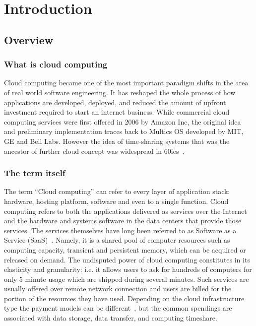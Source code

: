\documentclass[licencjacka,en]{thesisclass}
\begin{document}
\chapter{Introduction}


    \section{Overview}

        \subsection{What is cloud computing}

        Cloud computing became one of the most important paradigm shifts in the area of real world software engineering.
        It has reshaped the whole process of how applications are developed, deployed, and reduced the amount of upfront
        investment required to start an internet business. While commercial cloud computing services were first offered
        in 2006 by Amazon Inc, the original idea and preliminary implementation traces back to Multics OS developed by MIT,
        GE and Bell Labs. However the idea of time-sharing systems that was the ancestor of further cloud
        concept was widespread in 60ies~\cite{Markus}.

        \subsection{The term itself}

        The term “Cloud computing” can refer to every layer of application stack:
        hardware, hosting platform, software and even to a single function.
        Cloud computing refers to both the applications delivered as services over the Internet and
        the hardware and systems software in the data centers that provide those services.
        The services themselves have long been referred to as Software as a Service (SaaS)~\cite{Armbrust}.
        Namely, it is a shared pool of computer resources such as computing capacity,
        transient and persistent memory, which can be acquired or released on demand.
        The undisputed power of cloud computing constitutes in its elasticity and granularity:
        i.e. it allows users to ask for hundreds of computers for only 5 minute usage which
        are shipped during several minutes.
        Such services are usually offered over remote network connection and users are billed
        for the portion of the resources they have used.
        Depending on the cloud infrastructure type the payment models can be different~\cite{Laatikainen},
        but the common spendings are associated with data storage, data transfer, and computing timeshare.
\end{document}
